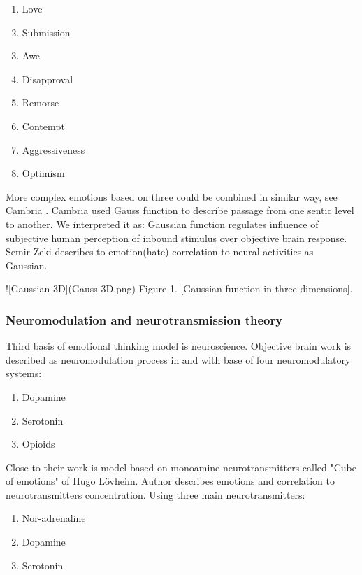 \begin{enumerate}
\item  Love
\item  Submission
\item  Awe
\item  Disapproval
\item  Remorse
\item  Contempt
\item  Aggressiveness
\item  Optimism
\end{enumerate}

More complex emotions based on three could be combined in similar way, see Cambria \cite{senticcomputing}.
Cambria \cite{hourglass} used Gauss function to describe passage from one sentic level to another. We interpreted it as: Gaussian function regulates influence of subjective human perception of inbound stimulus over objective brain response. Semir Zeki\cite{neuralcorrelatesofhate} describes to emotion(hate) correlation to neural activities as Gaussian.

![Gaussian 3D](Gauss 3D.png)
Figure 1. [Gaussian function in three dimensions].

\subsubsection{Neuromodulation and neurotransmission theory}

Third basis of emotional thinking model is neuroscience. Objective brain work is described as neuromodulation process in \cite{neuromodulatory} and \cite{emotionsbraintorobot} with base of four neuromodulatory systems:

\begin{enumerate}
\item  Dopamine
\item  Serotonin
\item  Opioids
\end{enumerate}

Close to their work is model based on monoamine neurotransmitters called "Cube of emotions" of Hugo Lövheim\cite{cubeofemotions}.
Author describes emotions and correlation to neurotransmitters concentration. Using three main neurotransmitters:

\begin{enumerate}
\item  Nor-adrenaline
\item  Dopamine
\item  Serotonin
\end{enumerate}


